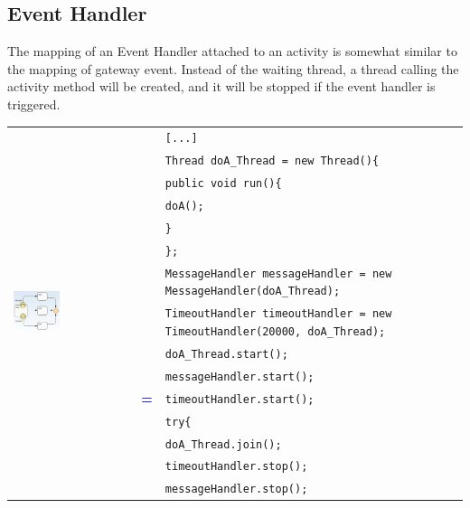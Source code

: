 \subsection{Event Handler}
The mapping of an Event Handler attached to an activity is somewhat similar to the mapping of gateway event. Instead of the waiting thread, a thread calling the activity method will be created, and it will be stopped if the event handler is triggered. 
\\
\begin{tabularx}{\linewidth}{lcX}
	\multirow{29}{*}{\includegraphics[width=0.4\textwidth]{images/mapping/event_handler.png}} &  & \texttt{[...]}\\
	& & \texttt{Thread doA\_Thread = new Thread()\{}\\
	& & \texttt{\hspace{10pt}public void run()\{}\\
	& & \texttt{\hspace{20pt}doA();}\\
	& & \texttt{\hspace{10pt}\}}\\
	& & \texttt{\};}\\
	& & \texttt{MessageHandler messageHandler = new MessageHandler(doA\_Thread);}\\
	& & \texttt{TimeoutHandler timeoutHandler = new TimeoutHandler(20000, doA\_Thread);}\\
	& & \texttt{doA\_Thread.start();}\\
	& & \texttt{messageHandler.start();}\\
	& \textbf{\textcolor{blue}{=}} & \texttt{timeoutHandler.start();}\\
	& & \texttt{try\{}\\
	& & \texttt{\hspace{10pt}doA\_Thread.join();}\\
	& & \texttt{\hspace{10pt}timeoutHandler.stop();}\\
	& & \texttt{\hspace{10pt}messageHandler.stop();}\\

\end{tabularx}
